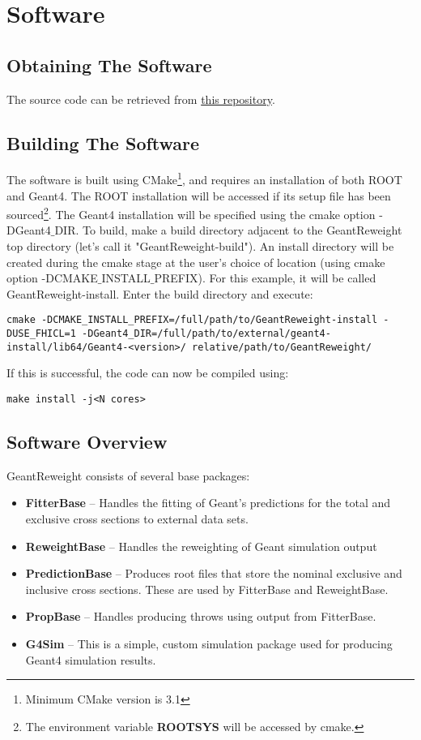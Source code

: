 \documentclass[12pt]{article}
\begin{document}
\section{Software}

\subsection{Obtaining The Software}

The source code can be retrieved from \href{https://github.com/calcuttj/GeantReweight}{this repository}.

\subsection{Building The Software}

The software is built using CMake\footnote{Minimum CMake version is 3.1}, and requires an installation of both ROOT and Geant4. The ROOT installation will be accessed if its setup file has been sourced\footnote{The environment variable \textbf{ROOTSYS} will be accessed by cmake.}. The Geant4 installation will be specified using the cmake option -DGeant4$\_$DIR. To build, make a build directory adjacent to the GeantReweight top directory (let's call it "GeantReweight-build"). An install directory will be created during the cmake stage at the user's choice of location (using cmake option -DCMAKE$\_$INSTALL$\_$PREFIX). For this example, it will be called GeantReweight-install. Enter the build directory and execute:
\begin{lstlisting}
cmake -DCMAKE_INSTALL_PREFIX=/full/path/to/GeantReweight-install -DUSE_FHICL=1 -DGeant4_DIR=/full/path/to/external/geant4-install/lib64/Geant4-<version>/ relative/path/to/GeantReweight/
\end{lstlisting}

If this is successful, the code can now be compiled using:
\begin{lstlisting}
make install -j<N cores>
\end{lstlisting}

\subsection{Software Overview}

GeantReweight consists of several base packages:
\begin{itemize}
	\item \textbf{FitterBase} -- Handles the fitting of Geant's predictions for the total and exclusive cross sections to external data sets.
	\item \textbf{ReweightBase} -- Handles the reweighting of Geant simulation output
	\item \textbf{PredictionBase} -- Produces root files that store the nominal exclusive and inclusive cross sections. These are used by FitterBase and ReweightBase. 
	\item \textbf{PropBase} -- Handles producing throws using output from FitterBase.
	\item \textbf{G4Sim} -- This is a simple, custom simulation package used for producing Geant4 simulation results.
\end{itemize}
\end{document}
